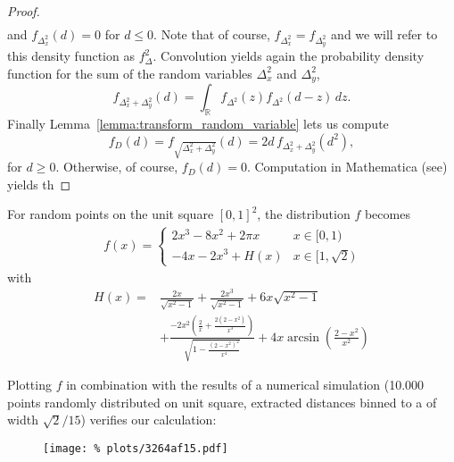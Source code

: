 \begin{proof}
\begin{align*}
  \end{align*}
  and $f_{\Delta_x^2}(d) = 0$ for $d \leq 0$. Note that of course,
  $f_{\Delta_x^2} = f_{\Delta_y^2}$ and we will refer to this density
  function as $f_\Delta^2$. Convolution yields again the probability
  density function for the sum of the random variables $\Delta_x^2$
  and $\Delta_y^2$,
  \[
    f_{\Delta_x^2 + \Delta_y^2}(d) = \int_{\mathbb{R}} f_{\Delta^2}(z)
    f_{\Delta^2}(d-z)\, dz.
  \]
  Finally Lemma~\ref{lemma:transform_random_variable} lets us compute
  \[
  f_D(d) = f_{\sqrt{\Delta_x^2 + \Delta_y^2}}(d) = 2d\, f_{\Delta_x^2 +
    \Delta_y^2}(d^2),
  \]
  for $d \geq 0$. Otherwise, of course, $f_D(d) = 0$. Computation in
  Mathematica (see) yields th 
\end{proof}

For random points on the unit square $[0,1]^2$, the distribution $f$
becomes
  \begin{align}\label{eq:dist_pdf}
    f(x) = \begin{cases} 2x^3 -8x^2 + 2\pi x & x \in [0,1) \\ %
                         - 4x -2x^3 + H(x)   &  x \in [1,\sqrt{2}) %
           \end{cases}
  \end{align}
  with
  \begin{align*}
    H(x) = 
      & \frac{2x}{\sqrt{x^2-1}} + \frac{2 x^3}{\sqrt{x^2-1}} + 
        6x \sqrt{x^2-1} \\
      & + \frac{-2 x^2 \left(\frac{2}{x} + 
          \frac{2 (2 - x^2)}{x^3}\right)}{\sqrt{1 - \frac{(2 -
            x^2)^2}{x^4}}} 
        + 4 x \operatorname{arcsin}\left(\frac{2 -x^2}{x^2}\right)
  \end{align*}

Plotting $f$ in combination with the results of a numerical simulation
(10.000 points randomly distributed on unit square, extracted
distances binned to a of width $\sqrt{2}/15$) verifies our calculation: 

\begin{figure}[h] \centering
  \texttt{[image: \%
    plots/3264af15.pdf]}%
  \label{fig:distance_distribution}
\end{figure}

